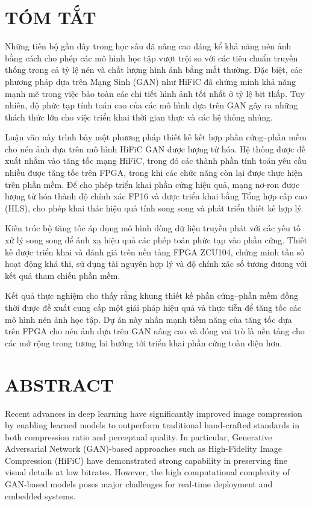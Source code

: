 \section*{TÓM TẮT}
Những tiến bộ gần đây trong học sâu đã nâng cao đáng kể khả năng nén ảnh bằng cách cho phép các mô hình học tập vượt trội so với các tiêu chuẩn truyền thống trong cả tỷ lệ nén và chất lượng hình ảnh bằng mắt thường. Đặc biệt, các phương pháp dựa trên Mạng Sinh (GAN) như HiFiC đã chứng minh khả năng mạnh mẽ trong việc bảo toàn các chi tiết hình ảnh tốt nhất ở tỷ lệ bit thấp. Tuy nhiên, độ phức tạp tính toán cao của các mô hình dựa trên GAN gây ra những thách thức lớn cho việc triển khai thời gian thực và các hệ thống nhúng.

Luận văn này trình bày một phương pháp thiết kế kết hợp phần cứng--phần mềm cho nén ảnh dựa trên mô hình HiFiC GAN được lượng tử hóa. Hệ thống được đề xuất nhắm vào tăng tốc mạng HiFiC, trong đó các thành phần tính toán yêu cầu nhiều được tăng tốc trên FPGA, trong khi các chức năng còn lại được thực hiện trên phần mềm. Để cho phép triển khai phần cứng hiệu quả, mạng nơ-ron được lượng tử hóa thành độ chính xác FP16 và được triển khai bằng Tổng hợp cấp cao (HLS), cho phép khai thác hiệu quả tính song song và phát triển thiết kế hợp lý.

Kiến trúc bộ tăng tốc áp dụng mô hình dòng dữ liệu truyền phát với các yếu tố xử lý song song để ánh xạ hiệu quả các phép toán phức tạp vào phần cứng. Thiết kế được triển khai và đánh giá trên nền tảng FPGA ZCU104, chứng minh tần số hoạt động khả thi, sử dụng tài nguyên hợp lý và độ chính xác số tương đương với kết quả tham chiếu phần mềm.

Kết quả thực nghiệm cho thấy rằng khung thiết kế phần cứng--phần mềm đồng thời được đề xuất cung cấp một giải pháp hiệu quả và thực tiễn để tăng tốc các mô hình nén ảnh học tập. Dự án này nhấn mạnh tiềm năng của tăng tốc dựa trên FPGA cho nén ảnh dựa trên GAN nâng cao và đóng vai trò là nền tảng cho các mở rộng trong tương lai hướng tới triển khai phần cứng toàn diện hơn.
\cleardoublepage

\section*{ABSTRACT}
Recent advances in deep learning have significantly improved image compression by enabling learned models to outperform traditional hand-crafted standards in both compression ratio and perceptual quality. In particular, Generative Adversarial Network (GAN)-based approaches such as High-Fidelity Image Compression (HiFiC) have demonstrated strong capability in preserving fine visual details at low bitrates. However, the high computational complexity of GAN-based models poses major challenges for real-time deployment and embedded systems.

